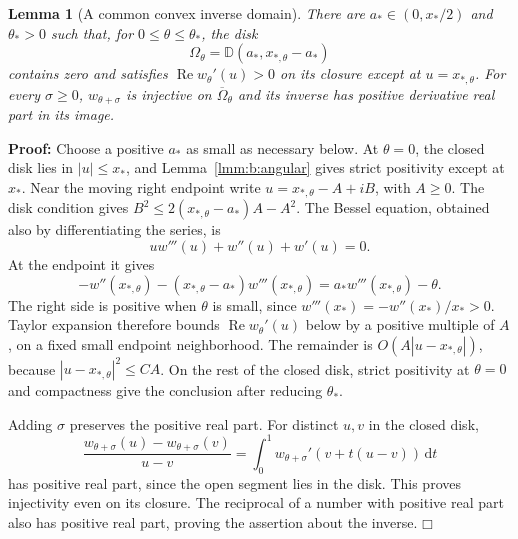 \documentclass[a4paper,10pt]{article}
\numberwithin{equation}{section}
\newcommand{\dd}{\mathrm{d}}
\theoremstyle{paperplain}
\newtheorem{lmm}[thm]{Lemma}
\theoremstyle{paperremark}
\theoremstyle{paperplain}
\newenvironment{prf}{\noindent \textbf{Proof: }}{\hfill $\mdlgwhtsquare$\par\addvspace{0.5\baselineskip}}
\begin{document}
\begin{lmm}[A common convex inverse domain]\label{lmm:b:convex-domain}
There are $a_*\in(0,x_*/2)$ and $\theta_*>0$ such that, for
$0\leq\theta\leq\theta_*$, the disk
\begin{equation}\label{eq:b:omega}
 \Omega_\theta=\mathbb D(a_*,x_{*,\theta}-a_*)
\end{equation}
contains zero and satisfies
$\operatorname{Re}w_\theta'(u)>0$ on its closure except at
$u=x_{*,\theta}$. For every $\sigma\geq0$, $w_{\theta+\sigma}$
is injective on $\overline\Omega_\theta$ and its inverse has positive
derivative real part in its image.
\end{lmm}
\begin{prf}
Choose a positive $a_*$ as small as necessary below.
At $\theta=0$, the closed disk lies in $|u|\leq x_*$, and
Lemma~\ref{lmm:b:angular} gives strict positivity except at $x_*$.
Near the moving right endpoint write
$u=x_{*,\theta}-A+iB$, with $A\geq0$. The disk condition gives
$B^2\leq2(x_{*,\theta}-a_*)A-A^2$. The Bessel equation, obtained
also by differentiating the series, is
\begin{equation}\label{eq:b:bessel-ode}
 u w'''(u)+w''(u)+w'(u)=0.
\end{equation}
At the endpoint it gives
\[
 -w''(x_{*,\theta})
 -(x_{*,\theta}-a_*)w'''(x_{*,\theta})
                      =a_*w'''(x_{*,\theta})-\theta.
\]
The right side is positive when $\theta$ is small, since
$w'''(x_*)=-w''(x_*)/x_*>0$. Taylor expansion therefore bounds
$\operatorname{Re}w_\theta'(u)$ below by a positive multiple of
$A$, on a fixed small endpoint neighborhood. The remainder is
$O(A|u-x_{*,\theta}|)$, because $|u-x_{*,\theta}|^2\leq C A$.
On the rest of the closed disk, strict positivity at $\theta=0$
and compactness give the conclusion after reducing $\theta_*$.

Adding $\sigma$ preserves the positive real part. For distinct
$u,v$ in the closed disk,
\[
 \frac{w_{\theta+\sigma}(u)-w_{\theta+\sigma}(v)}{u-v}
 =\int_0^1w_{\theta+\sigma}'(v+t(u-v))\,\dd t
\]
has positive real part, since the open segment lies in the disk.
This proves injectivity even on its closure. The reciprocal of a
number with positive real part also has positive real part, proving
the assertion about the inverse.
\end{prf}
\end{document}
